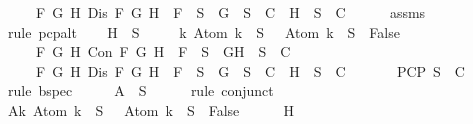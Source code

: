 \begin{isabellebody}
\ \ \ \ {\isasymand}\ {\isacharparenleft}{\isasymforall}F\ G\ H{\isachardot}\ Dis\ F\ G\ H\ {\isasymlongrightarrow}\ F\ {\isasymin}\ S\ {\isasymlongrightarrow}\ {\isacharbraceleft}G{\isacharbraceright}\ {\isasymunion}\ S\ {\isasymin}\ C\ {\isasymor}\ {\isacharbraceleft}H{\isacharbraceright}\ {\isasymunion}\ S\ {\isasymin}\ C{\isacharparenright}{\isachardoublequoteclose}\isanewline
\ \ \ \ \isamarkupfalse%
\ assms{\isacharparenleft}{}{\isacharparenright}\ \isamarkupfalse%
\ {\isacharparenleft}rule\ pcp{\isacharunderscore}alt{}{\isacharparenright}\isanewline
\ \ \isamarkupfalse%
\ H{\isacharcolon}{\isachardoublequoteopen}{\isasymbottom}\ {\isasymnotin}\ S\isanewline
\ \ \ \ {\isasymand}\ {\isacharparenleft}{\isasymforall}k{\isachardot}\ Atom\ k\ {\isasymin}\ S\ {\isasymlongrightarrow}\ \isactrlbold {\isasymnot}\ {\isacharparenleft}Atom\ k{\isacharparenright}\ {\isasymin}\ S\ {\isasymlongrightarrow}\ False{\isacharparenright}\isanewline
\ \ \ \ {\isasymand}\ {\isacharparenleft}{\isasymforall}F\ G\ H{\isachardot}\ Con\ F\ G\ H\ {\isasymlongrightarrow}\ F\ {\isasymin}\ S\ {\isasymlongrightarrow}\ {\isacharbraceleft}G{\isacharcomma}H{\isacharbraceright}\ {\isasymunion}\ S\ {\isasymin}\ C{\isacharparenright}\isanewline
\ \ \ \ {\isasymand}\ {\isacharparenleft}{\isasymforall}F\ G\ H{\isachardot}\ Dis\ F\ G\ H\ {\isasymlongrightarrow}\ F\ {\isasymin}\ S\ {\isasymlongrightarrow}\ {\isacharbraceleft}G{\isacharbraceright}\ {\isasymunion}\ S\ {\isasymin}\ C\ {\isasymor}\ {\isacharbraceleft}H{\isacharbraceright}\ {\isasymunion}\ S\ {\isasymin}\ C{\isacharparenright}{\isachardoublequoteclose}\isanewline
\ \ \ \ \ \isamarkupfalse%
\ PCP\ {\isacartoucheopen}S\ {\isasymin}\ C{\isacartoucheclose}\ \isamarkupfalse%
\ {\isacharparenleft}rule\ bspec{\isacharparenright}\isanewline
\ \ \isamarkupfalse%
\ \isamarkupfalse%
\ A{}{\isacharcolon}{\isachardoublequoteopen}{\isasymbottom}\ {\isasymnotin}\ S{\isachardoublequoteclose}\isanewline
\ \ \ \ \isamarkupfalse%
\ {\isacharparenleft}rule\ conjunct{}{\isacharparenright}\isanewline
\ \ \isamarkupfalse%
\ A{}{\isacharcolon}{\isachardoublequoteopen}{\isasymforall}k{\isachardot}\ Atom\ k\ {\isasymin}\ S\ {\isasymlongrightarrow}\ \isactrlbold {\isasymnot}\ {\isacharparenleft}Atom\ k{\isacharparenright}\ {\isasymin}\ S\ {\isasymlongrightarrow}\ False{\isachardoublequoteclose}\isanewline
\ \ \ \ \isamarkupfalse%
\ H\ \isamarkupfalse%

\end{isabellebody}
